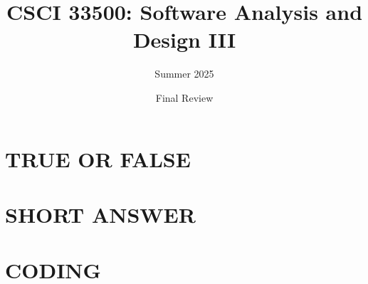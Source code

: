 \documentclass[a4paper]{article}
\title{CSCI 33500: Software Analysis and Design III}
\author{Summer 2025}
\date{Final Review}
\begin{document}
\maketitle


\section{TRUE OR FALSE}
\begin{enumerate}
    
\end{enumerate}
\newpage


\section{SHORT ANSWER}
\begin{enumerate}
    
\end{enumerate}
\newpage 


\section{CODING}
\begin{enumerate}
    
\end{enumerate}
\end{document}
